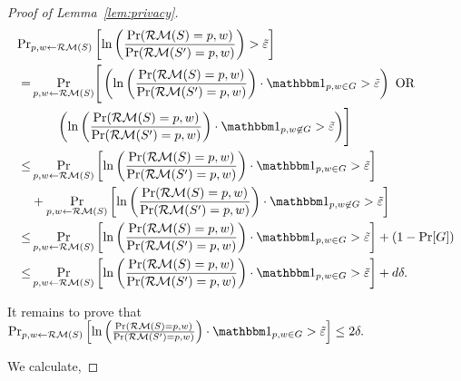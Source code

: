 \documentclass[12pt,a4paper,oneside,onecolumn]{book}
\begin{document}
\begin{proof}[Proof of Lemma~\ref{lem:privacy}]
\begin{align*}
    \Pr&_{p,w \leftarrow \RandMargin(S)}\left[\ln\left(\frac{\Pr(\RandMargin(S)=p,w)}{\Pr(\RandMargin(S')=p,w)}\right)
       > \bigeps  \right] \\
   =&
     \Pr_{p,w \leftarrow \RandMargin(S)}\Biggr[ \left(
     \ln\left(\frac{\Pr(\RandMargin(S)=p,w)}{\Pr(\RandMargin(S')=p,w)}\right)
     \cdot
     \indicator{p,w \in G}
     > \bigeps \right)
     \text{ OR } \\
     &\qquad \left(
     \ln\left(\frac{\Pr(\RandMargin(S)=p,w)}{\Pr(\RandMargin(S')=p,w)}\right)
     \cdot
     \indicator{p,w \not\in G}
     > \bigeps \right) \Biggr]\\
   \leq& 
     \Pr_{p,w \leftarrow \RandMargin(S)}\left[\ln\left(\frac{\Pr(\RandMargin(S)=p,w)}{\Pr(\RandMargin(S')=p,w)}\right)
     \cdot \indicator{p,w \in G}
     > \bigeps \right] \\
     &+
     \Pr_{p,w \leftarrow \RandMargin(S)}\left[\ln\left(\frac{\Pr(\RandMargin(S)=p,w)}{\Pr(\RandMargin(S')=p,w)}\right)
     \cdot \indicator{p,w \not\in G}
     > \bigeps \right] \\  
   \leq& 
     \Pr_{p,w \leftarrow \RandMargin(S)}\left[\ln\left(\frac{\Pr(\RandMargin(S)=p,w)}{\Pr(\RandMargin(S')=p,w)}\right)
     \cdot \indicator{p,w \in G}
     > \bigeps \right]
     +
     (1 - \Pr[G]) \\
   \leq&
     \Pr_{p,w \leftarrow \RandMargin(S)}\left[\ln\left(\frac{\Pr(\RandMargin(S)=p,w)}{\Pr(\RandMargin(S')=p,w)}\right)
     \cdot \indicator{p,w \in G}
     > \bigeps \right]
     +
     d\delta.
\end{align*}

It remains to prove that
$\Pr_{p,w \leftarrow \RandMargin(S)}
\left[\ln\left(\frac{\Pr(\RandMargin(S)=p,w)}{\Pr(\RandMargin(S')=p,w)}\right)
  \cdot \indicator{p,w \in G}
  > \bigeps \right] \leq 2\delta.$ 
  
  We calculate,




\end{proof}
\end{document}
